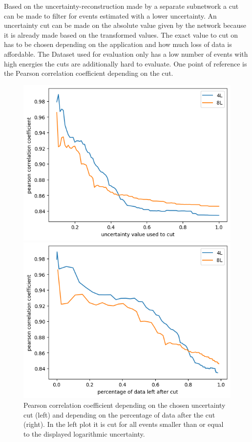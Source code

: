 \documentclass[
  tucolor,       %
  BCOR=12mm,     %
  parskip=half,  %
  open=any,      %
  cleardoublepage=plain,  %
]{tudothesis}
\begin{document}
Based on the uncertainty-reconstruction made by a separate subnetwork a cut can be made to filter for events estimated with a lower uncertainty. 
An uncertainty cut can be made on the absolute value given by the network because it is already made based on the transformed values.
The exact value to cut on has to be chosen depending on the application and how much loss of data is affordable. The Dataset used for evaluation only has a low number of events with high energies the cuts are additionally hard to evaluate. One point of reference is the Pearson correlation coefficient depending on the cut.
\begin{figure}
  \centering
  \begin{minipage}[t]{0.49\textwidth}
    \includegraphics[width=\textwidth]{Plots/Pearson depending on cut}
  \end{minipage}
  \begin{minipage}[t]{0.49\textwidth}
    \includegraphics[width=\textwidth]{Plots/Pearson depending on cut percentage}
  \end{minipage}
  \caption{Pearson correlation coefficient depending on the chosen uncertainty cut (left) and depending on the percentage of data after the cut (right). In the left plot it is cut for all events smaller than or equal to the displayed logarithmic uncertainty.}
  \label{fig:Pearson(cut)}
\end{figure}
\end{document}
